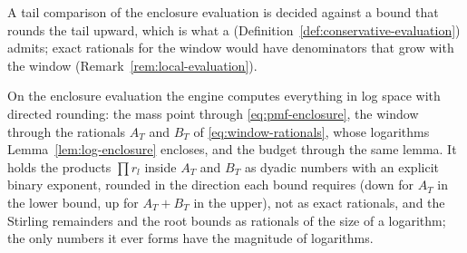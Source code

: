 
A tail comparison of the enclosure evaluation is decided against a bound that
rounds the tail upward, which is what a 
(Definition~\ref{def:conservative-evaluation}) admits;
exact rationals for the window would have denominators that grow with the
window (Remark~\ref{rem:local-evaluation}).

\begin{requirement}\label{req:enclosure-substrate}
On the enclosure evaluation the engine computes everything in log space with
directed rounding: the mass point through \eqref{eq:pmf-enclosure}, the window
through the rationals $A_T$ and $B_T$ of \eqref{eq:window-rationals}, whose
logarithms Lemma~\ref{lem:log-enclosure} encloses, and the budget through the
same lemma. It holds the products $\prod r_l$ inside $A_T$ and $B_T$ as
dyadic numbers with an explicit binary exponent, rounded in the direction
each bound requires (down for $A_T$ in the lower bound, up for $A_T+B_T$ in
the upper), not as exact rationals, and the Stirling remainders and the root
bounds as rationals of the size of a logarithm; the only numbers it ever
forms have the magnitude of logarithms.
\end{requirement}
